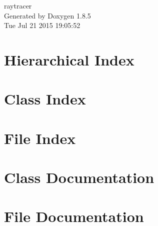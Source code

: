 \documentclass[twoside]{book}
\newcommand{\clearemptydoublepage}{%
  \newpage{\pagestyle{empty}\cleardoublepage}%
}
\begin{document}
\hypersetup{pageanchor=false}
\begin{titlepage}
\vspace*{7cm}
\begin{center}%
{\Large raytracer }\\
\vspace*{1cm}
{\large Generated by Doxygen 1.8.5}\\
\vspace*{0.5cm}
{\small Tue Jul 21 2015 19:05:52}\\
\end{center}
\end{titlepage}
\clearemptydoublepage
\tableofcontents
\clearemptydoublepage
{}
\hypersetup{pageanchor=true}

\chapter{Hierarchical Index}

\chapter{Class Index}

\chapter{File Index}

\chapter{Class Documentation}













\chapter{File Documentation}


























\newpage
{}
{}
\printindex
\end{document}
